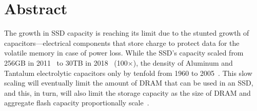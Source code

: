 \section*{Abstract}
The growth in SSD capacity is reaching its limit 
due to the stunted growth of capacitors---electrical components that store charge 
to protect data for the volatile memory in case of power loss. 
While the SSD's capacity scaled from 256GB in 2011~\cite{samsung2011} to 30TB in 2018~\cite{anandtech18samsung} (100$\times$), 
the density of Aluminum and Tantalum electrolytic capacitors only by tenfold from 1960 to 2005~\cite{both2015modern}.
This slow scaling will eventually limit the amount of DRAM that can be used in an SSD,
and this, in turn, will also limit the storage capacity as the size of DRAM and aggregate flash capacity proportionally scale~\cite{samsung_ratio, ni2017hash}. 

